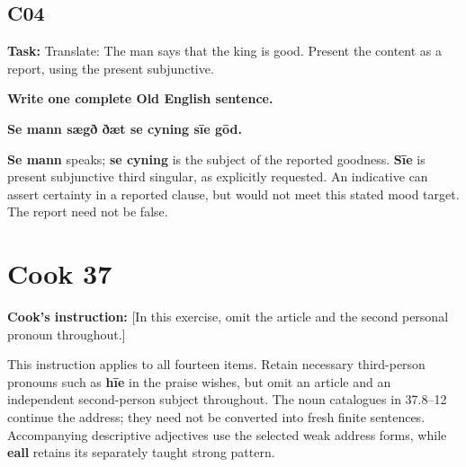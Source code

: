 \subsection*{C04}

\textbf{Task:} Translate: The man says that the king is good. Present the content as a report, using the present subjunctive.

\textbf{Write one complete Old English sentence.}

\textbf{Se mann sægð ðæt se cyning sīe gōd.}

\textbf{Se mann} speaks; \textbf{se cyning} is the subject of the reported goodness. \textbf{Sīe} is present subjunctive third singular, as explicitly requested. An indicative can assert certainty in a reported clause, but would not meet this stated mood target. The report need not be false.

\clearpage
\section*{Cook 37}

\textbf{Cook's instruction:} [In this exercise, omit the article and the second personal pronoun throughout.]

This instruction applies to all fourteen items. Retain necessary third-person pronouns such as \textbf{hīe} in the praise wishes, but omit an article and an independent second-person subject throughout. The noun catalogues in 37.8–12 continue the address; they need not be converted into fresh finite sentences. Accompanying descriptive adjectives use the selected weak address forms, while \textbf{eall} retains its separately taught strong pattern.

